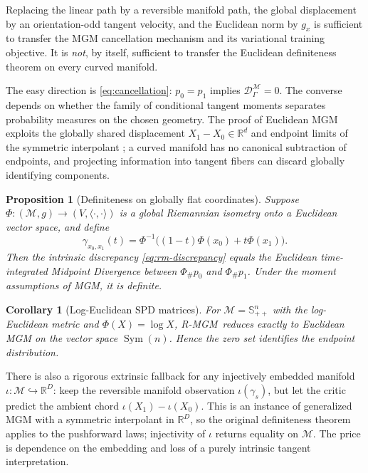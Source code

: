 \documentclass[10pt,twocolumn]{article}
\newtheorem{proposition}{Proposition}
\newtheorem{corollary}{Corollary}
\newcommand{\M}{\mathcal{M}}
\newcommand{\R}{\mathbb{R}}
\newcommand{\Sym}{\operatorname{Sym}}
\newcommand{\RMGM}{\textsc{R-MGM}}
\begin{document}
\begin{takeaway}
Replacing the linear path by a reversible manifold path, the global displacement by an orientation-odd tangent velocity, and the Euclidean norm by $g_x$ is sufficient to transfer the MGM cancellation mechanism and its variational training objective. It is \emph{not}, by itself, sufficient to transfer the Euclidean definiteness theorem on every curved manifold.
\end{takeaway}

The easy direction is \cref{eq:cancellation}: $p_0=p_1$ implies $\mathcal D_{\Gamma}^{\M}=0$. The converse depends on whether the family of conditional tangent moments separates probability measures on the chosen geometry. The proof of Euclidean MGM exploits the globally shared displacement $X_1-X_0\in\R^d$ and endpoint limits of the symmetric interpolant \citep{shlenskii2026midpoint}; a curved manifold has no canonical subtraction of endpoints, and projecting information into tangent fibers can discard globally identifying components.

\begin{proposition}[Definiteness on globally flat coordinates]
Suppose $\Phi:(\M,g)\to(V,\langle\cdot,\cdot\rangle)$ is a global Riemannian isometry onto a Euclidean vector space, and define
\begin{equation}
 \gamma_{x_0,x_1}(t)=\Phi^{-1}\!\bigl((1-t)\Phi(x_0)+t\Phi(x_1)\bigr).
\end{equation}
Then the intrinsic discrepancy \cref{eq:rm-discrepancy} equals the Euclidean time-integrated Midpoint Divergence between $\Phi_\#p_0$ and $\Phi_\#p_1$. Under the moment assumptions of MGM, it is definite.
\end{proposition}

\begin{corollary}[Log-Euclidean SPD matrices]
For $\M=\mathbb S_{++}^n$ with the log-Euclidean metric and $\Phi(X)=\log X$, \RMGM\ reduces exactly to Euclidean MGM on the vector space $\Sym(n)$. Hence the zero set identifies the endpoint distribution.
\end{corollary}

There is also a rigorous extrinsic fallback for any injectively embedded manifold $\iota:\M\hookrightarrow\R^D$: keep the reversible manifold observation $\iota(\gamma_s)$, but let the critic predict the ambient chord $\iota(X_1)-\iota(X_0)$. This is an instance of generalized MGM with a symmetric interpolant in $\R^D$, so the original definiteness theorem applies to the pushforward laws; injectivity of $\iota$ returns equality on $\M$. The price is dependence on the embedding and loss of a purely intrinsic tangent interpretation.
\end{document}

